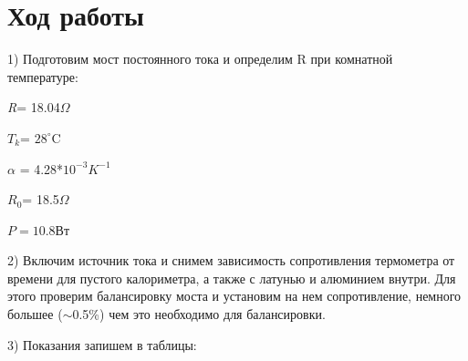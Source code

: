 \documentclass[a4paper,12pt]{article} %
\begin{document}
\section{Ход работы}
1) Подготовим мост постоянного тока и определим R при комнатной температуре:

\textit{R}= 18.04$\Omega$

$T_k$= $28^{\circ}$C

$\alpha$ = 4.28*$10^{-3} K^{-1}$

$R_0$= 18.5$\Omega$

$P=10.8 Вт$

2) Включим источник тока и снимем зависимость сопротивления термометра от времени для пустого калориметра, а также с латунью и алюминием внутри. Для этого проверим балансировку моста и установим на нем сопротивление, немного большее ($\sim$0.5\%) чем это необходимо для балансировки.

3) Показания запишем в таблицы:
\end{document}

